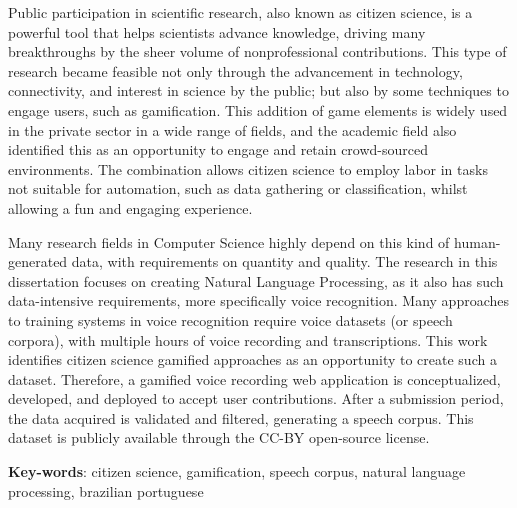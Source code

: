 
\setlength{\absparsep}{18pt}
\begin{resumo}
Public participation in scientific research, also known as citizen science, is a powerful tool that helps scientists advance knowledge, driving many breakthroughs by the sheer volume of nonprofessional contributions. This type of research became feasible not only through the advancement in technology, connectivity, and interest in science by the public; but also by some techniques to engage users, such as gamification. This addition of game elements is widely used in the private sector in a wide range of fields, and the academic field also identified this as an opportunity to engage and retain crowd-sourced environments. The combination allows citizen science to employ labor in tasks not suitable for automation, such as data gathering or classification, whilst allowing a fun and engaging experience. 

Many research fields in Computer Science highly depend on this kind of human-generated data, with requirements on quantity and quality. The research in this dissertation focuses on creating Natural Language Processing, as it also has such data-intensive requirements, more specifically voice recognition. Many approaches to training systems in voice recognition require voice datasets (or speech corpora), with multiple hours of voice recording and transcriptions. This work identifies citizen science gamified approaches as an opportunity to create such a dataset. Therefore, a gamified voice recording web application is conceptualized, developed, and deployed to accept user contributions. After a submission period, the data acquired is validated and filtered, generating a speech corpus. This dataset is publicly available through the CC-BY open-source license.
	\vspace{\onelineskip}
	\noindent 
	
	\textbf{Key-words}: citizen science, gamification, speech corpus, natural language processing, brazilian portuguese
\end{resumo}
